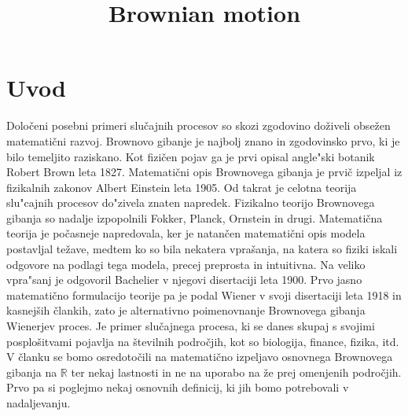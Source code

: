 \documentclass[twoside,11pt]{article}
\begin{document}



\klasifikacija{~} 
\title{Brownian motion}

\glava\baselineskip=14.5pt

\smallskip

\section{Uvod}

Določeni posebni primeri slučajnih procesov so skozi zgodovino doživeli obsežen
matematični razvoj. Brownovo gibanje je najbolj znano in zgodovinsko prvo, ki je bilo 
temeljito raziskano. Kot fizičen pojav ga je prvi opisal angle"ski botanik Robert Brown leta 1827.
Matematični opis Brownovega gibanja je prvič izpeljal iz fizikalnih zakonov Albert
Einstein leta 1905. Od takrat je celotna teorija slu"cajnih procesov do"zivela znaten napredek. Fizikalno teorijo Brownovega gibanja
so nadalje izpopolnili Fokker, Planck, Ornstein in drugi. Matematična 
teorija je počasneje napredovala, ker je natančen matematični opis modela postavljal 
težave, medtem ko so bila nekatera vprašanja, na katera so fiziki iskali odgovore na
podlagi tega modela, precej preprosta in intuitivna. Na veliko vpra"sanj je odgovoril Bachelier
v njegovi disertaciji leta 1900.
Prvo jasno matematično formulacijo teorije pa je podal Wiener v svoji
disertaciji leta 1918 in kasnejših člankih, zato je alternativno poimenovnanje 
Brownovega gibanja Wienerjev proces. Je primer slučajnega procesa, ki se danes skupaj s 
svojimi posplošitvami pojavlja na številnih področjih, kot so biologija, finance, fizika,
itd. V članku se bomo osredotočili na matematično izpeljavo osnovnega Brownovega gibanja 
na $\mathbb{R}$ ter nekaj lastnosti in ne na uporabo na že prej omenjenih področjih.
Prvo pa si poglejmo nekaj osnovnih definicij, ki jih bomo potrebovali v nadaljevanju.
\end{document}
